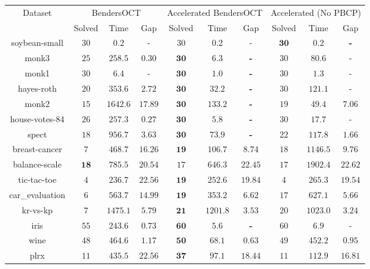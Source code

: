\begin{tabular}{cccccccccc}
\hline
\multirow{2}{*}{Dataset} & \multicolumn{3}{c}{BendersOCT} & \multicolumn{3}{c}{Accelerated BendersOCT} & \multicolumn{3}{c}{Accelerated (No PBCP)}\\
  & Solved & Time & Gap & Solved & Time & Gap & Solved & Time & Gap\\
\hline
soybean-small & $30$ & $0.2$ & - & $30$ & $0.2$ & - & $\mathbf{30}$ & $\mathbf{0.2}$ & \textbf{-}\\
monk3 & $25$ & $258.5$ & $0.30$ & $\mathbf{30}$ & $\mathbf{6.3}$ & \textbf{-} & $30$ & $80.6$ & -\\
monk1 & $30$ & $6.4$ & - & $\mathbf{30}$ & $\mathbf{1.0}$ & \textbf{-} & $30$ & $1.3$ & -\\
hayes-roth & $20$ & $353.6$ & $2.72$ & $\mathbf{30}$ & $\mathbf{32.2}$ & \textbf{-} & $30$ & $121.1$ & -\\
monk2 & $15$ & $1642.6$ & $17.89$ & $\mathbf{30}$ & $\mathbf{133.2}$ & \textbf{-} & $19$ & $49.4$ & $7.06$\\
house-votes-84 & $26$ & $257.3$ & $0.27$ & $\mathbf{30}$ & $\mathbf{5.8}$ & \textbf{-} & $30$ & $17.7$ & -\\
spect & $18$ & $956.7$ & $3.63$ & $\mathbf{30}$ & $\mathbf{73.9}$ & \textbf{-} & $22$ & $117.8$ & $1.66$\\
breast-cancer & $7$ & $468.7$ & $16.26$ & $\mathbf{19}$ & $\mathbf{106.7}$ & $\mathbf{8.74}$ & $18$ & $1146.5$ & $9.76$\\
balance-scale & $\mathbf{18}$ & $\mathbf{785.5}$ & $\mathbf{20.54}$ & $17$ & $646.3$ & $22.45$ & $17$ & $1902.4$ & $22.62$\\
tic-tac-toe & $4$ & $236.7$ & $22.56$ & $\mathbf{19}$ & $\mathbf{252.6}$ & $\mathbf{19.84}$ & $4$ & $265.3$ & $19.54$\\
car\_evaluation & $6$ & $563.7$ & $14.99$ & $\mathbf{19}$ & $\mathbf{353.2}$ & $\mathbf{6.62}$ & $17$ & $627.1$ & $5.66$\\
kr-vs-kp & $7$ & $1475.1$ & $5.79$ & $\mathbf{21}$ & $\mathbf{1201.8}$ & $\mathbf{3.53}$ & $20$ & $1023.0$ & $3.24$\\
\hline
iris & $55$ & $243.6$ & $0.73$ & $\mathbf{60}$ & $\mathbf{5.6}$ & \textbf{-} & $60$ & $6.9$ & -\\
wine & $48$ & $464.6$ & $1.17$ & $\mathbf{50}$ & $\mathbf{68.1}$ & $\mathbf{0.63}$ & $49$ & $452.2$ & $0.95$\\
plrx & $11$ & $435.5$ & $22.56$ & $\mathbf{37}$ & $\mathbf{97.1}$ & $\mathbf{18.44}$ & $11$ & $112.9$ & $16.81$\\

\end{tabular}
